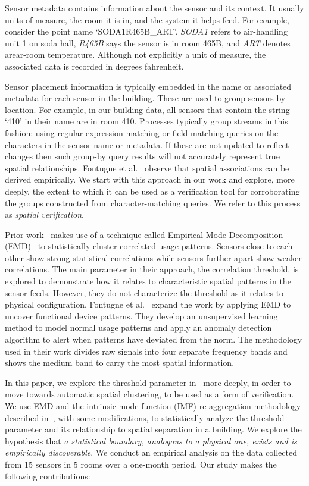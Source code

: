 Sensor metadata contains information about the sensor and its context.  It usually units of measure, 
the room it is in, and the system it helps feed.  For example, consider the point name `SODA1R465B\_ART'.
\emph{SODA1} refers to air-handling unit 1 on soda hall, \emph{R465B} says the sensor is in room 465B, and \emph{ART}
denotes arear-room temperature.  Although not explicitly a unit of measure, the associated data is recorded in degrees
fahrenheit.

Sensor placement information is typically embedded in the name or associated metadata for each sensor in the building.
These are used to group sensors by location.  For example, in our building data, all sensors that contain the string
 `410' in their name are in room 410.  Processes typically group streams in this fashion: using regular-expression matching 
or field-matching queries on the characters in the sensor name or metadata.  If these are not updated to reflect changes
then such group-by query results will not accurately represent true spatial relationships.  
Fontugne et al.~\cite{IOT} observe that spatial associations can be derived empirically.  We start with this approach in our 
work and explore, more deeply, the extent to which it can be used 
as a verification tool for corroborating the groups constructed from character-matching queries.  We refer
to this process as \emph{spatial verification}.

Prior work~\cite{IOT} makes use of a technique called Empirical Mode Decomposition (EMD)~\cite{EMD} to statistically cluster correlated
usage patterns.  Sensors close to each other show strong statistical correlations while sensors further apart show weaker correlations.  
The main parameter in their approach, the correlation threshold, is explored to demonstrate how it relates to characteristic spatial patterns
 in the sensor feeds.  However, they do not characterize the threshold as it relates to physical configuration.
Fontugne et al.~\cite{SBS} expand the work by applying EMD to uncover functional device patterns.  They develop
an unsupervised learning method to model normal usage patterns and apply an anomaly detection algorithm to alert when patterns
have deviated from the norm.  The methodology used in their work divides raw signals into four separate frequency bands
and shows the medium band to carry the most spatial information.

In this paper, we explore the threshold parameter in~\cite{IOT} more deeply, in order to move towards automatic spatial clustering, 
to be used as a form of verification. We use EMD and the intrinsic mode function (IMF) re-aggregation methodology described in~\cite{SBS}, with some modifications, to statistically analyze the threshold parameter
and its relationship to spatial separation in a building.  We explore the hypothesis that \emph{a statistical boundary, analogous to a physical one,
exists and is empirically discoverable}.
We conduct an empirical analysis on the data collected from 15 sensors in 5 rooms over a one-month period.  Our study makes the following contributions:

